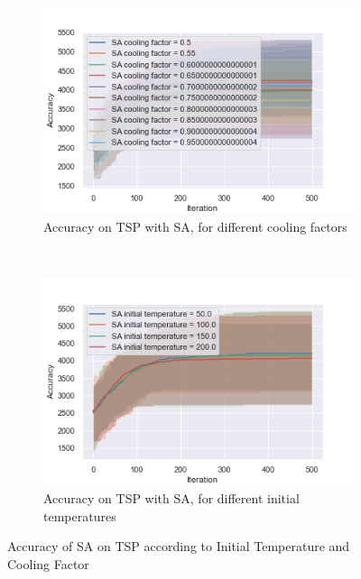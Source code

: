 \documentclass[twocolumn, 10pt]{article}
\begin{document}
				\begin{figure}[h]
					\centering
					\begin{subfigure}[t]{0.45\columnwidth}
						\centering
						\includegraphics[width=\linewidth]{../graphics/tsp_SA_Iteration_Error_SA_cooling_factor.png}
						\caption{Accuracy on TSP with SA, for different cooling factors}
						\label{tsp:sa_cooling}
					\end{subfigure}
					~
					\begin{subfigure}[t]{0.45\columnwidth}
						\centering
						\includegraphics[width=1\linewidth]{../graphics/tsp_SA_Iteration_Error_SA_initial_temperature.png}
						\caption{Accuracy on TSP with SA, for different initial temperatures}
						\label{tsp:sa_initial_temp}
					\end{subfigure}
					\caption{Accuracy of SA on TSP according to Initial Temperature and Cooling Factor}
					\label{tsp:sa}
				\end{figure}
\end{document}
